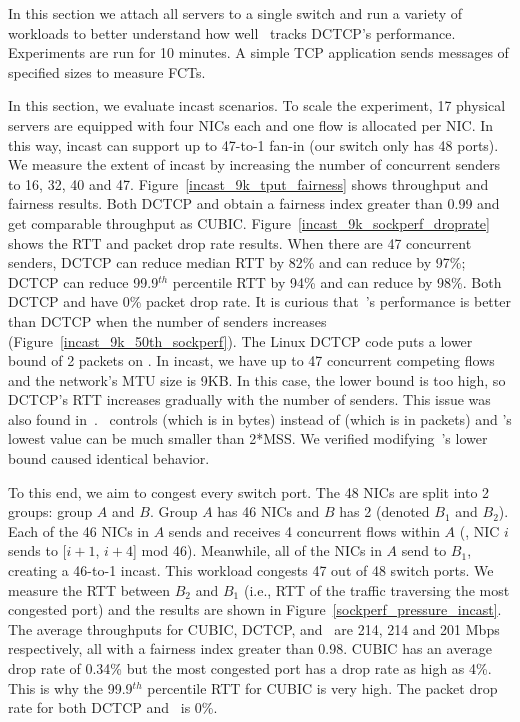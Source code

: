 In this section we attach all servers to a single switch and
run a variety of workloads to better understand
how well~\acdc{} tracks DCTCP's performance. Experiments are run for 10 minutes. A simple TCP application
sends messages of specified sizes to measure FCTs.

In this section, we evaluate incast scenarios.
To scale the experiment, 17 physical servers are equipped with four NICs each
and one flow is allocated per NIC.
In this way, incast can support up to 47-to-1 fan-in (our switch only has 48 ports).
We measure the extent of incast by increasing the number of concurrent senders to 16, 32, 40 and 47.
Figure~\ref{incast_9k_tput_fairness} shows throughput and fairness results.
Both DCTCP and \acdc{} obtain a fairness index greater than 0.99 and get comparable throughput as CUBIC.
Figure~\ref{incast_9k_sockperf_droprate} shows the RTT and packet drop rate results.
When there are 47 concurrent senders, DCTCP can reduce median RTT by 82\% and \acdc{} can reduce by 97\%;
DCTCP can reduce 99.9$^{th}$ percentile RTT by 94\% and \acdc{} can reduce by 98\%.
Both DCTCP and \acdc{} have 0\% packet drop rate. It is curious that~\acdc{}’s
performance is better than DCTCP when the number of senders increases (Figure~\ref{incast_9k_50th_sockperf}).
The Linux DCTCP code puts a lower bound of 2 packets on \cwnd{}.
In incast, we have up to 47 concurrent competing flows and
the network's MTU size is 9KB. In this case, the lower bound is too high,
so DCTCP's RTT increases gradually with the number of senders.
This issue was also found in~\cite{judd2015nsdi}.~\acdc{} controls \rwnd{} (which is in bytes)
instead of \cwnd{} (which is in packets) and \rwnd{}'s lowest value can be much smaller than 2*MSS.
We verified modifying~\acdc{}'s lower bound caused identical behavior.

To this end, we aim to congest every switch port.
The 48 NICs are split into 2 groups: group $A$ and $B$.
Group $A$ has 46 NICs and $B$ has 2 (denoted $B_1$ and $B_2$).
Each of the 46 NICs in $A$ sends and receives 4 concurrent flows within $A$
(\ie{}, NIC $i$ sends to [$i+1$, $i+4$] mod 46).
Meanwhile, all of the NICs in $A$ send to $B_1$, creating a 46-to-1 incast.
This workload congests 47 out of 48 switch ports.
We measure the RTT between $B_2$ and $B_1$ (i.e., RTT of the traffic traversing the most congested port) and
the results are shown in Figure~\ref{sockperf_pressure_incast}.
The average throughputs for CUBIC, DCTCP, and~\acdc{} are 214, 214 and 201 Mbps respectively,
all with a fairness index greater than 0.98.
CUBIC has an average drop rate of 0.34\% but the most congested port has a drop rate as high as 4\%.
This is why the 99.9$^{th}$ percentile RTT for CUBIC is very high.
The packet drop rate for both DCTCP and~\acdc{} is 0\%.

